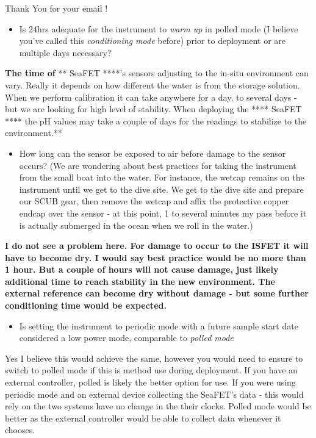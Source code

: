 \documentclass[]{book}
\providecommand{\tightlist}{%
  \setlength{\itemsep}{0pt}\setlength{\parskip}{0pt}}
\begin{document}
Thank You for your email !

\begin{itemize}
\tightlist
\item
  Is 24hrs adequate for the instrument to \emph{warm up} in polled mode (I believe you've called this \emph{conditioning mode} before) prior to deployment or are multiple days necessary?
\end{itemize}

\textbf{The time of }** SeaFET ****'s sensors adjusting to the in-situ environment can vary. Really it depends on how different the water is from the storage solution.
When we perform calibration it can take anywhere for a day, to several days - but we are looking for high level of stability.
When deploying the **** SeaFET **** the pH values may take a couple of days for the readings to stabilize to the environment.**

\begin{itemize}
\tightlist
\item
  How long can the sensor be exposed to air before damage to the sensor occurs? (We are wondering about best practices for taking the instrument from the small boat into the water. For instance, the wetcap remains on the instrument until we get to the dive site. We get to the dive site and prepare our SCUB gear, then remove the wetcap and affix the protective copper endcap over the sensor - at this point, 1 to several minutes my pass before it is actually submerged in the ocean when we roll in the water.)
\end{itemize}

\textbf{I do not see a problem here. For damage to occur to the ISFET it will have to become dry. I would say best practice would be no more than 1 hour. But a couple of hours will not cause damage, just likely additional time to reach stability in the new environment. The external reference can become dry without damage - but some further conditioning time would be expected.}

\begin{itemize}
\tightlist
\item
  Is setting the instrument to periodic mode with a future sample start date considered a low power mode, comparable to \emph{polled mode}
\end{itemize}

Yes I believe this would achieve the same, however you would need to ensure to switch to polled mode if this is method use during deployment.
If you have an external controller, polled is likely the better option for use. If you were using periodic mode and an external device collecting the SeaFET's data - this would rely on the two systems have no change in the their clocks. Polled mode would be better as the external controller would be able to collect data whenever it chooses.
\end{document}
